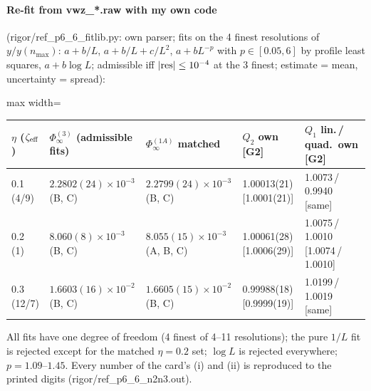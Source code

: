 \documentclass[11pt]{article}
\begin{document}
\paragraph{Re-fit from vwz\_*.raw with my own code} (rigor/ref\_p6\_6\_fitlib.py: own parser; fits on the 4 finest
resolutions of $y/y(n_{\max})$: $a+b/L$, $a+b/L+c/L^2$, $a+bL^{-p}$ with $p\in[0.05,6]$ by profile least squares,
$a+b\log L$; admissible iff $|{\rm res}|\le10^{-4}$ at the 3 finest; estimate = mean, uncertainty = spread):
\begin{center}\small
\begin{adjustbox}{max width=\textwidth}\begin{tabular}{lllll}
\toprule
$\eta$ ($\zeta_{\rm eff}$) & $\Phi^{(3)}_\infty$ (admissible fits) & $\Phi^{(1A)}_\infty$ matched & $Q_2$ own [G2] & $Q_1$ lin.\,/\,quad.\ own [G2]\\
\midrule
0.1 (4/9) & $2.2802(24)\times10^{-3}$ (B, C) & $2.2799(24)\times10^{-3}$ (B, C) & 1.00013(21) [1.0001(21)] & 1.0073\,/\,0.9940 [same]\\
0.2 (1) & $8.060(8)\times10^{-3}$ (B, C) & $8.055(15)\times10^{-3}$ (A, B, C) & 1.00061(28) [1.0006(29)] & 1.0075\,/\,1.0010 [1.0074\,/\,1.0010]\\
0.3 (12/7) & $1.6603(16)\times10^{-2}$ (B, C) & $1.6605(15)\times10^{-2}$ (B, C) & 0.99988(18) [0.9999(19)] & 1.0199\,/\,1.0019 [same]\\
\bottomrule
\end{tabular}\end{adjustbox}
\end{center}
All fits have one degree of freedom (4 finest of 4--11 resolutions); the pure $1/L$ fit is rejected except for
the matched $\eta=0.2$ set; $\log L$ is rejected everywhere; $p=1.09$--$1.45$. Every number of the card's (i) and
(ii) is reproduced to the printed digits (rigor/ref\_p6\_6\_n2n3.out).
\end{document}
